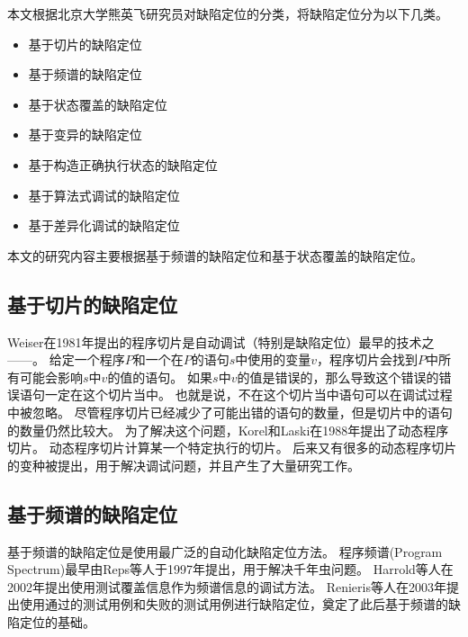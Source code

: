 本文根据北京大学熊英飞研究员对缺陷定位的分类\parencite{YingfeiFL}，将缺陷定位分为以下几类。

\begin{itemize}
\item 基于切片的缺陷定位
\item 基于频谱的缺陷定位
\item 基于状态覆盖的缺陷定位
\item 基于变异的缺陷定位
\item 基于构造正确执行状态的缺陷定位
\item 基于算法式调试的缺陷定位
\item 基于差异化调试的缺陷定位
\end{itemize}

本文的研究内容主要根据基于频谱的缺陷定位和基于状态覆盖的缺陷定位。

\subsection{基于切片的缺陷定位}

Weiser在1981年提出的程序切片\parencite{Weiser1981Program,Weiser1984Program}是自动调试（特别是缺陷定位）最早的技术之——。
给定一个程序$P$和一个在$P$的语句$s$中使用的变量$v$，程序切片会找到$P$中所有可能会影响$s$中$v$的值的语句。
如果$s$中$v$的值是错误的，那么导致这个错误的错误语句一定在这个切片当中。
也就是说，不在这个切片当中语句可以在调试过程中被忽略。
尽管程序切片已经减少了可能出错的语句的数量，但是切片中的语句的数量仍然比较大。
为了解决这个问题，Korel和Laski在1988年提出了动态程序切片\parencite{Korel1988Dynamic}。
动态程序切片计算某一个特定执行的切片。
后来又有很多的动态程序切片的变种被提出\parencite{Demillo1996Critical,Gyim1999An,Zhang2006Pruning,Zhang2003Precise}，用于解决调试问题，并且产生了大量研究工作\parencite{Agrawal1993Debugging,Liu2007Indexing,Al2005The,Alves2011Fault,Ju2014HSFal,Wotawa2010Fault,Mao2014Slice}。

\subsection{基于频谱的缺陷定位}

基于频谱的缺陷定位是使用最广泛的自动化缺陷定位方法\parencite{YingfeiFL}。
程序频谱(Program Spectrum)最早由Reps等人于1997年提出\parencite{Reps1997The}，用于解决千年虫问题。
Harrold等人在2002年\parencite{Harrold2000An}提出使用测试覆盖信息作为频谱信息的调试方法。
Renieris等人在2003年提出使用通过的测试用例和失败的测试用例进行缺陷定位\parencite{Renieres2003Fault}，奠定了此后基于频谱的缺陷定位的基础。

